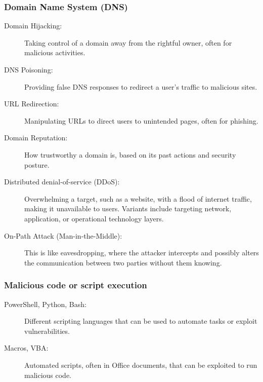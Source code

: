 \begin{fullwidth}
    \subsubsection*{\color{blue}Domain Name System (DNS)}
    \begin{description}
        \item[Domain Hijacking:] Taking control of a domain away from the rightful owner, often for malicious activities.
        \item[DNS Poisoning:] Providing false DNS responses to redirect a user’s traffic to malicious sites.
        \item[URL Redirection:] Manipulating URLs to direct users to unintended pages, often for phishing.
        \item[Domain Reputation:] How trustworthy a domain is, based on its past actions and security posture.
    \end{description}

   
    \begin{description}
        \item[Distributed denial-of-service (DDoS):] Overwhelming a target, such as a website, with a flood of internet traffic, making it unavailable to users. Variants include targeting network, application, or operational technology layers.
        \item[On-Path Attack (Man-in-the-Middle):] This is like eavesdropping, where the attacker intercepts and possibly alters the communication between two parties without them knowing.
    \end{description}
    
    \subsubsection*{\color{green}Malicious code or script execution}
    \begin{description}
        \item[PowerShell, Python, Bash:] Different scripting languages that can be used to automate tasks or exploit vulnerabilities.
        \item[Macros, VBA:] Automated scripts, often in Office documents, that can be exploited to run malicious code.
    \end{description}
    
\end{fullwidth}

\newpage
